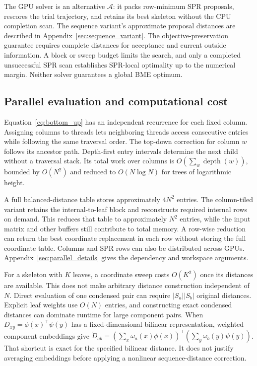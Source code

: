 \documentclass[11pt,a4paper]{article}
\makeatletter
\DeclareRobustCommand{\_}{\ifmmode\nfss@text{\textunderscore}\else\textunderscore\allowbreak\fi}
\theoremstyle{definition}
\makeatother
\begin{document}
The GPU solver is an alternative $\mathcal A$: it packs row-minimum SPR proposals, rescores the trial trajectory, and retains its best skeleton without the CPU completion scan.
The sequence variant's approximate proposal distances are described in Appendix~\ref{sec:sequence_variant}.
The objective-preservation guarantee requires complete distances for acceptance and current outside information.
A block or sweep budget limits the search, and only a completed unsuccessful SPR scan establishes SPR-local optimality up to the numerical margin.
Neither solver guarantees a global BME optimum.

\subsection{Parallel evaluation and computational cost}
\label{sec:parallel}

Equation~\eqref{eq:bottom_up} has an independent recurrence for each fixed column.
Assigning columns to threads lets neighboring threads access consecutive entries while following the same traversal order.
The top-down correction for column $w$ follows its ancestor path.
Depth-first entry intervals determine the next child without a traversal stack.
Its total work over columns is $O(\sum_w\operatorname{depth}(w))$, bounded by $O(N^2)$ and reduced to $O(N\log N)$ for trees of logarithmic height.

A full balanced-distance table stores approximately $4N^2$ entries.
The column-tiled variant retains the internal-to-leaf block and reconstructs required internal rows on demand.
This reduces that table to approximately $N^2$ entries, while the input matrix and other buffers still contribute to total memory.
A row-wise reduction can return the best coordinate replacement in each row without storing the full coordinate table.
Columns and SPR rows can also be distributed across GPUs.
Appendix~\ref{sec:parallel_details} gives the dependency and workspace arguments.

For a skeleton with $K$ leaves, a coordinate sweep costs $O(K^2)$ once its distances are available.
This does not make arbitrary distance construction independent of $N$.
Direct evaluation of one condensed pair can require $|S_a||S_b|$ original distances.
Explicit leaf weights use $O(N)$ entries, and constructing exact condensed distances can dominate runtime for large component pairs.
When $D_{xy}=\phi(x)^\top\psi(y)$ has a fixed-dimensional bilinear representation, weighted component embeddings give
$\widetilde D_{ab}=(\sum_x\omega_a(x)\phi(x))^\top
(\sum_y\omega_b(y)\psi(y))$.
That shortcut is exact for the specified bilinear distance.
It does not justify averaging embeddings before applying a nonlinear sequence-distance correction.
\end{document}

